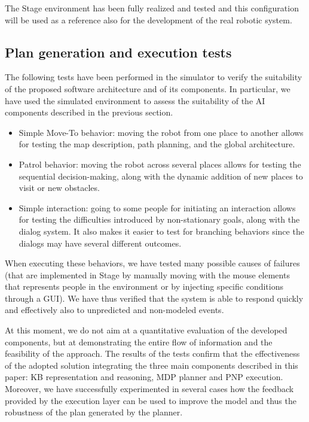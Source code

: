 The Stage environment has been fully realized and tested and this configuration will be used as a reference also for the development of the real robotic system.

\subsection{Plan generation and execution tests}

The following tests have been performed in the simulator to verify the suitability of the proposed software architecture and of its components. In particular, we have used the simulated environment to assess the suitability of the AI components described in the previous section.

\begin{itemize}
\item Simple Move-To behavior: moving the robot from one place to another allows for testing the map description, path planning, and the global architecture.
\item Patrol behavior: moving the robot across several places allows for testing the sequential decision-making, along with the dynamic addition of new places to visit or new obstacles.
\item Simple interaction: going to some people for initiating an interaction allows for testing the difficulties introduced by non-stationary goals, along with the dialog system. It also makes it easier to test for branching behaviors since the dialogs may have several different outcomes.
\end{itemize}

When executing these behaviors, we have tested many possible causes of failures (that are implemented in Stage by manually moving with the mouse elements that represents people in the environment or by injecting specific conditions through a GUI). We have thus verified that the system is able to respond quickly and effectively also to unpredicted and non-modeled events.

At this moment, we do not aim at a quantitative evaluation of the developed components, but at demonstrating the entire flow of information and the feasibility of the approach.
The results of the tests confirm that the effectiveness of the adopted solution integrating the three main components described in this paper: KB representation and reasoning, MDP planner and PNP execution. Moreover, we have successfully experimented in several cases how the feedback provided by the execution layer can be used to improve the model and thus the robustness of the plan generated by the planner.

